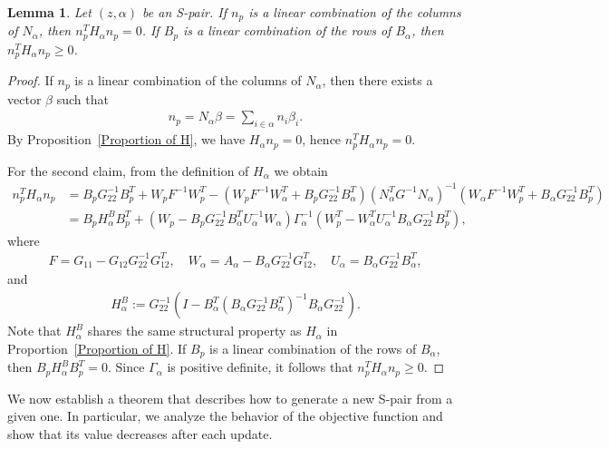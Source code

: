 \documentclass{article}
\newtheorem{lemma}{Lemma}
\begin{document}
	\begin{lemma}\label{lemma linear}
		Let $(z, \alpha)$ be an S-pair.  
		If $n_{p}$ is a linear combination of the columns of $N_{\alpha}$, then $n_{p}^{T}H_{\alpha}n_{p} = 0$.  
		If $B_{p}$ is a linear combination of the rows of $B_{\alpha}$, then $n_{p}^{T}H_{\alpha}n_{p} \ge 0$.
	\end{lemma}
	
	\begin{proof}
		If $n_{p}$ is a linear combination of the columns of $N_{\alpha}$, then there exists a vector $\beta$ such that 
		\begin{align*}
		n_{p} = N_{\alpha}\beta = \sum_{i \in \alpha} n_{i}\beta_{i}.
		\end{align*}
		By Proposition~\ref{Proportion of H}, we have $H_{\alpha}n_{p} = 0$, hence $n_{p}^{T}H_{\alpha}n_{p} = 0$.
		
		For the second claim, from the definition of $H_{\alpha}$ we obtain
		\begin{align*}
			n_{p}^{T}H_{\alpha}n_{p}
			&= B_{p}G_{22}^{-1}B_{p}^{T} + W_{p}F^{-1}W_{p}^{T} 
			- (W_{p}F^{-1}W_{\alpha}^{T} + B_{p}G_{22}^{-1}B_{\alpha}^{T})(N_{\alpha}^{T}G^{-1}N_{\alpha})^{-1}
			(W_{\alpha}F^{-1}W_{p}^{T} + B_{\alpha}G_{22}^{-1}B_{p}^{T}) \\
			&= B_{p}H_{\alpha}^{B}B_{p}^{T} 
			+ (W_{p} - B_{p}G_{22}^{-1}B_{\alpha}^{T}U_{\alpha}^{-1}W_{\alpha})
			\Gamma_{\alpha}^{-1}
			(W_{p}^{T} - W_{\alpha}^{T}U_{\alpha}^{-1}B_{\alpha}G_{22}^{-1}B_{p}^{T}),
		\end{align*}
		where 
		\begin{align*}
		F = G_{11} - G_{12}G_{22}^{-1}G_{12}^{T}, \quad
		W_{\alpha} = A_{\alpha} - B_{\alpha}G_{22}^{-1}G_{12}^{T}, \quad
		U_{\alpha} = B_{\alpha}G_{22}^{-1}B_{\alpha}^{T},
		\end{align*}
		and 
		\begin{align*}
		H_{\alpha}^{B} := G_{22}^{-1}\left(I - B_{\alpha}^{T}(B_{\alpha}G_{22}^{-1}B_{\alpha}^{T})^{-1}B_{\alpha}G_{22}^{-1}\right).
		\end{align*}
		Note that $H_{\alpha}^{B}$ shares the same structural property as $H_{\alpha}$ in Proportion~\ref{Proportion of H}.  
		If $B_{p}$ is a linear combination of the rows of $B_{\alpha}$, then $B_{p}H_{\alpha}^{B}B_{p}^{T} = 0$.  
		Since $\Gamma_{\alpha}$ is positive definite, it follows that $n_{p}^{T}H_{\alpha}n_{p} \ge 0$.
	\end{proof}
	
	We now establish a theorem that describes how to generate a new S-pair from a given one. 
	In particular, we analyze the behavior of the objective function and show that its value decreases after each update.
	
\end{document}
